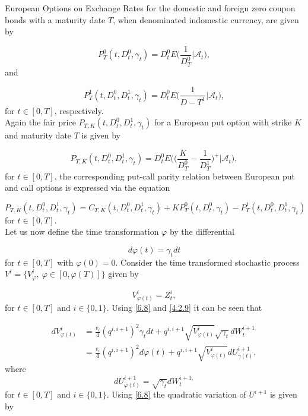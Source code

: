 \documentclass[unknownkeysallowed, compress]{beamer}
\theoremstyle{plain}
\begin{document}
\begin{frame}[allowframebreaks]{European Options on Exchange Rates}
for the domestic and foreign zero coupon bonds with a maturity date $T$, when denominated indomestic currency, are given by



\begin{equation}\label{6.4}
P_T^0(t,D_t^0,\gamma_t) = D_t^0E\bigg(\frac{1}{D_T^0}\bigg|\mathcal{A}_t\bigg),
\end{equation}
and

\begin{equation}\label{6.5}
P_T^1(t,D_t^0, D_t^1, \gamma_t) = D_t^0 E\bigg(\frac{1}{D-T^1}\bigg|\mathcal{A}_t\bigg),
\end{equation}
for $t\in[0,T]$, respectively.\\
Again %
 the fair price $P_{T,K}(t,D_t^0,D_t^1, \gamma_t)$ for a European put option with strike $K$ and maturity date $T$ is given by

\begin{equation}\label{6.6}
P_{T,K}(t,D_t^0,D_t^1,\gamma_t) = D_t^0E\bigg(\bigg(\frac{K}{D_T^0} - \frac{1}{D_T^1}\bigg)^+\bigg|\mathcal{A}_t\bigg),
\end{equation}
for $t\in[0,T]$, the corresponding put-call parity relation between European put and call options is expressed via the equation

\begin{equation}\label{6.7}
P_{T,K}(t,D_t^0,D_t^1,\gamma_t) = C_{T,K}(t,D_t^0,D_t^1, \gamma_t)+KP_T^0(t,D_t^0,\gamma_t) - P_T^1(t,D_t^0, D_t^1, \gamma_t)
\end{equation}
for $t\in[0,T]$.\\
Let us now define the time transformation $\varphi$ by the differential

\begin{equation}\label{6.8}
d\varphi(t) = \gamma_tdt
\end{equation}
for $t\in[0,T]$ with $\varphi(0) = 0$. Consider the time transformed stochastic process $V^i = \{V^i_{\varphi},~\varphi\in[0,\varphi(T)]\}$ given by 

\begin{equation}\label{4.2.9}
V_{\varphi(t)}^i = Z_t^i,
\end{equation}
for $t\in[0,T]$ and $i\in\{0,1\}$. Using %
\eqref{6.8} and \eqref{4.2.9} it can be seen that

\begin{equation}\label{4.2.10}
\begin{split}
dV_{\varphi(t)}^i& = \frac{v_i}{4}(q^{i,i+1})^2\gamma_tdt+q^{i,i+1}\sqrt{V^i_{\varphi(t)}}\sqrt{\gamma_t}dW_t^{i+1}\\
& = \frac{v_i}{4}(q^{i,i+1})^2d\varphi(t)+q^{i,i+1}\sqrt{V^i_{\varphi(t)}}dU_{\gamma(t)}^{i+1},%
\end{split}
\end{equation}
where
$$
dU_{\varphi(t)}^{i+1} = \sqrt{\gamma_t}dW_t^{i+1,}
$$
for $t\in[0,T]$ and $i\in\{0,1\}$. Using \eqref{6.8} the quadratic variation of $U^{i+1}$ is given by


\end{frame}
\end{document}
